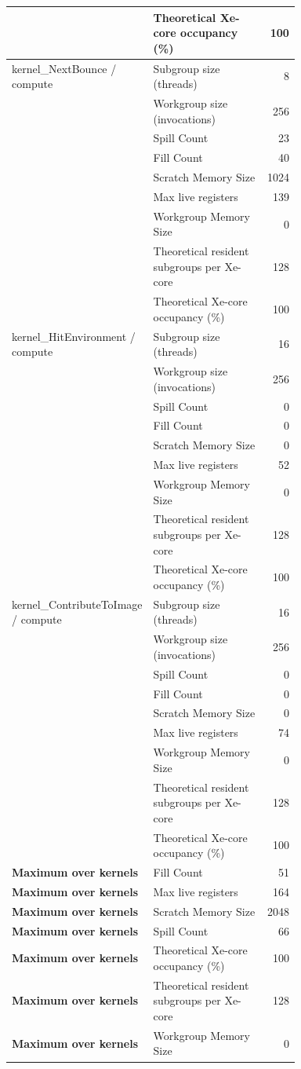 \begin{longtable}{p{0.30\linewidth}p{0.43\linewidth}r}
 & Theoretical Xe-core occupancy (\%) & 100 \\
\hline
kernel\_NextBounce / compute & Subgroup size (threads) & 8 \\
 & Workgroup size (invocations) & 256 \\
 & Spill Count & 23 \\
 & Fill Count & 40 \\
 & Scratch Memory Size & 1024 \\
 & Max live registers & 139 \\
 & Workgroup Memory Size & 0 \\
 & Theoretical resident subgroups per Xe-core & 128 \\
 & Theoretical Xe-core occupancy (\%) & 100 \\
\hline
kernel\_HitEnvironment / compute & Subgroup size (threads) & 16 \\
 & Workgroup size (invocations) & 256 \\
 & Spill Count & 0 \\
 & Fill Count & 0 \\
 & Scratch Memory Size & 0 \\
 & Max live registers & 52 \\
 & Workgroup Memory Size & 0 \\
 & Theoretical resident subgroups per Xe-core & 128 \\
 & Theoretical Xe-core occupancy (\%) & 100 \\
\hline
kernel\_ContributeToImage / compute & Subgroup size (threads) & 16 \\
 & Workgroup size (invocations) & 256 \\
 & Spill Count & 0 \\
 & Fill Count & 0 \\
 & Scratch Memory Size & 0 \\
 & Max live registers & 74 \\
 & Workgroup Memory Size & 0 \\
 & Theoretical resident subgroups per Xe-core & 128 \\
 & Theoretical Xe-core occupancy (\%) & 100 \\
\hline
\textbf{Maximum over kernels} & Fill Count & 51 \\
\textbf{Maximum over kernels} & Max live registers & 164 \\
\textbf{Maximum over kernels} & Scratch Memory Size & 2048 \\
\textbf{Maximum over kernels} & Spill Count & 66 \\
\textbf{Maximum over kernels} & Theoretical Xe-core occupancy (\%) & 100 \\
\textbf{Maximum over kernels} & Theoretical resident subgroups per Xe-core & 128 \\
\textbf{Maximum over kernels} & Workgroup Memory Size & 0 \\
\hline
\end{longtable}

